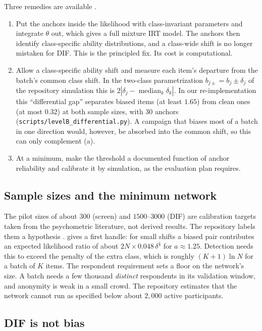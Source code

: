 Three remedies are available \openq.
\begin{enumerate}[label=(\alph*)]
  \item Put the anchors inside the likelihood with class-invariant parameters and integrate
    $\theta$ out, which gives a full mixture IRT model. The anchors then identify class-specific
    ability distributions, and a class-wide shift is no longer mistaken for DIF. This is the
    principled fix. Its cost is computational.
  \item Allow a class-specific ability shift and measure each item's departure from the batch's
    common class shift. In the two-class parametrization $b_{j\pm}=b_j\pm\delta_j$ of the
    repository simulation this is $2|\delta_j-\operatorname{median}_k\delta_k|$. In our re-implementation
    this ``differential gap'' separates biased items (at least $1.65$) from clean ones (at most
    $0.32$) at both sample sizes, with 30 anchors
    (\texttt{scripts/levelB\_differential.py}). A campaign that biases most of a batch in
    one direction would, however, be absorbed into the common shift, so this can only
    complement (a).
  \item At a minimum, make the threshold a documented function of anchor reliability and
    calibrate it by simulation, as the evaluation plan requires.
\end{enumerate}

\subsection{Sample sizes and the minimum network}

The pilot sizes of about $300$ (screen) and $1500$--$3000$ (DIF) are calibration targets taken
from the psychometric literature, not derived results. The repository labels them a
hypothesis \openq.  gives a first handle: for small shifts a biased pair
contributes an expected likelihood ratio of about $2N\times0.048\,\delta^4$ for $a\approx1.25$. Detection needs
this to exceed the penalty of the extra class, which is roughly $(K+1)\ln N$ for a batch of $K$
items. The respondent requirement sets a floor on the network's size. A batch needs a few
thousand \emph{distinct} respondents in its validation window, and anonymity is weak in a small
crowd. The repository estimates that the network cannot run as specified below about $2{,}000$
active participants.

\subsection{DIF is not bias}\label{sec:dif-not-bias}

